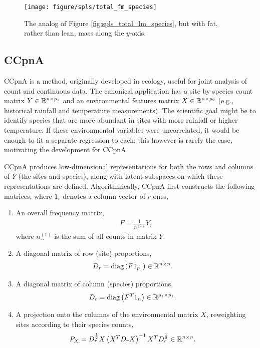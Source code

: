 \documentclass[14pt]{extarticle}
\begin{document}
\begin{figure}
  \centering
  \texttt{[image: figure/spls/total\_fm\_species]}
  \caption{The analog of Figure \ref{fig:spls_total_lm_species}, but with fat,
    rather than lean, mass along the $y$-axis. \label{fig:spls_total_fm_species}
  }
\end{figure}

\subsection{CCpnA}
\label{subsec:canonical-correspondence}

CCpnA is a method, originally developed in ecology, useful for joint analysis of
count and continuous data. The canonical application has a site by species count
matrix $Y \in \mathbb{R}^{n \times p_{1}}$ and an environmental features matrix $X
\in \mathbb{R}^{n \times p_{2}}$ (e.g., historical rainfall and temperature
measurements). The scientific goal might be to identify species that are more
abundant in sites with more rainfall or higher temperature. If these
environmental variables were uncorrelated, it would be enough to fit a separate
regression to each; this however is rarely the case, motivating the development
for CCpnA.

CCpnA produces low-dimensional representations for both the rows and columns of
$Y$ (the sites and species), along with latent subspaces on which these
representations are defined. Algorithmically, CCpnA first constructs the
following matrices, where $1_{r}$ denotes a column vector of $r$ ones,
\begin{enumerate}
  \item An overall frequency matrix,
    \begin{align*}
      F = \frac{1}{n_{\cdot\cdot}^{(1)}} Y,
  \end{align*}
  where $n_{\cdot\cdot}^{(1)}$ is the sum of all counts in matrix
  $Y$.
\item A diagonal matrix of row (site) proportions,
  \begin{align*}
    D_{r} &= \mathop\mathrm{diag}\left(F 1_{p_{1}}\right) \in \mathbb{R}^{n \times n}.
  \end{align*}
\item A diagonal matrix of column (species) proportions,
  \begin{align*}
    D_{c} &= \mathop\mathrm{diag}\left(F^{T}1_{n}\right) \in \mathbb{R}^{p_{1} \times p_{1}}.
  \end{align*}
\item A projection onto the columns of the environmental matrix
  $X$, reweighting sites according to their species counts,
  \begin{align*}
    P_{X} &= D_{r}^{\frac{1}{2}}X\left(X^{T}D_{r}X\right)^{-1}X^{T}D_{r}^{\frac{1}{2}} \in
  \mathbb{R}^{n \times n}.
\end{align*}
\end{enumerate}
\end{document}
